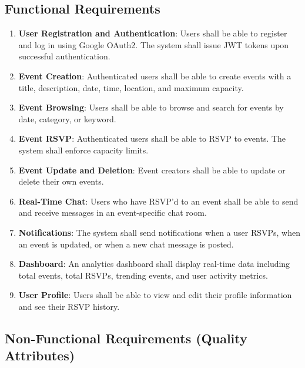 \documentclass[12pt,a4paper]{article}
\begin{document}
\subsection{Functional Requirements}

\begin{enumerate}[label=\textbf{FR-\arabic*}]
    \item \textbf{User Registration and Authentication}: Users shall be able to register and log in using Google OAuth2. The system shall issue JWT tokens upon successful authentication.
    \item \textbf{Event Creation}: Authenticated users shall be able to create events with a title, description, date, time, location, and maximum capacity.
    \item \textbf{Event Browsing}: Users shall be able to browse and search for events by date, category, or keyword.
    \item \textbf{Event RSVP}: Authenticated users shall be able to RSVP to events. The system shall enforce capacity limits.
    \item \textbf{Event Update and Deletion}: Event creators shall be able to update or delete their own events.
    \item \textbf{Real-Time Chat}: Users who have RSVP'd to an event shall be able to send and receive messages in an event-specific chat room.
    \item \textbf{Notifications}: The system shall send notifications when a user RSVPs, when an event is updated, or when a new chat message is posted.
    \item \textbf{Dashboard}: An analytics dashboard shall display real-time data including total events, total RSVPs, trending events, and user activity metrics.
    \item \textbf{User Profile}: Users shall be able to view and edit their profile information and see their RSVP history.
\end{enumerate}

\subsection{Non-Functional Requirements (Quality Attributes)}
\end{document}
